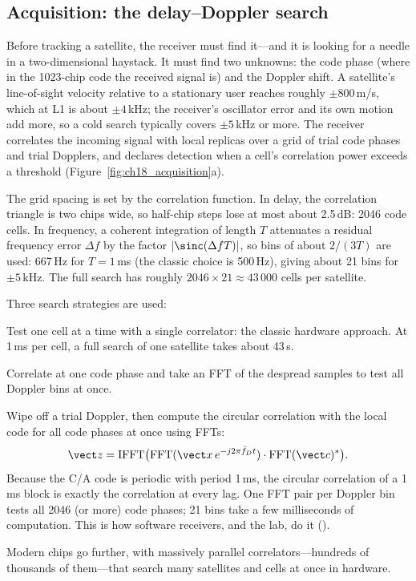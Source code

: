 \subsection{Acquisition: the delay--Doppler search}
\label{sec:ch18:acq}

Before tracking a satellite, the receiver must find it---and it is looking for a needle in a
two-dimensional haystack. It must find two unknowns: the code phase (where in the 1023-chip code
the received signal is) and the Doppler shift. A satellite's line-of-sight velocity relative to a
stationary user reaches roughly $\pm800$\,m/s, which at L1 is about $\pm4$\,kHz; the receiver's
oscillator error and its own motion add more, so a cold search typically covers $\pm5$\,kHz or
more. The receiver correlates the incoming signal with local replicas over a grid of trial code
phases and trial Dopplers, and declares detection when a cell's correlation power exceeds a
threshold (Figure~\ref{fig:ch18_acquisition}a).

The grid spacing is set by the correlation function. In delay, the correlation triangle is
two chips wide, so half-chip steps lose at most about 2.5\,dB: 2046 code cells. In frequency,
a coherent integration of length $T$ attenuates a residual frequency error $\Delta f$ by the
factor $|\sinc(\Delta fT)|$, so bins of about $2/(3T)$ are used: 667\,Hz for $T=1$\,ms (the
classic choice is 500\,Hz), giving about 21 bins for $\pm5$\,kHz. The full search has
roughly $2046\times21\approx43\,000$ cells per satellite.

Three search strategies are used:
\begin{description}[style=nextline,leftmargin=1.2em,font=\sffamily\bfseries\small\color{navy}]
\item[Serial search.] Test one cell at a time with a single correlator: the classic hardware
approach. At 1\,ms per cell, a full search of one satellite takes about 43\,s.
\item[Parallel frequency search.] Correlate at one code phase and take an FFT of the
despread samples to test all Doppler bins at once.
\item[Parallel code-phase search.] Wipe off a trial Doppler, then compute the circular
correlation with the local code for all code phases at once using FFTs:
\begin{equation}
\vect z=\mathrm{IFFT}\big(\mathrm{FFT}(\vect x\,e^{-j2\pi\hat f_Dt})\cdot\mathrm{FFT}(\vect c)^*\big).
\label{eq:ch18:fftacq}
\end{equation}
Because the C/A code is periodic with period 1\,ms, the circular correlation of a 1\,ms block is
exactly the correlation at every lag. One FFT pair per Doppler bin tests all 2046 (or more)
code phases; 21 bins take a few milliseconds of computation. This is how software receivers,
and the lab, do it ().
\end{description}
Modern chips go further, with massively parallel correlators---hundreds of thousands of
them---that search many satellites and cells at once in hardware.

